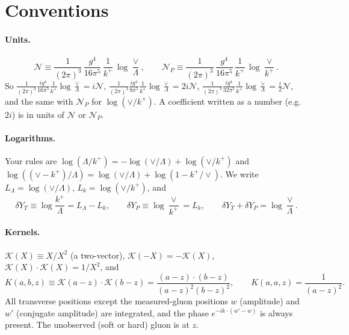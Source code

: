 \documentclass[10pt]{article}
\numberwithin{equation}{section}
\newcommand{\KK}{\mathcal K}
\newcommand{\NN}{\mathcal N}
\newcommand{\NP}{\mathcal N_{P}}
\begin{document}
\section{Conventions}\label{sec:conv}
\paragraph{Units.}
\begin{equation}
\NN\equiv\frac{1}{(2\pi)^3}\,\frac{g^4}{16\pi^5}\,\frac{1}{k^+}\,\log\frac{\vee}{\Lambda},\qquad
\NP\equiv\frac{1}{(2\pi)^3}\,\frac{g^4}{16\pi^5}\,\frac{1}{k^+}\,\log\frac{\vee}{k^+}.
\label{eq:NN}
\end{equation}
So $\frac{1}{(2\pi)^3}\frac{ig^4}{16\pi^5}\frac{1}{k^+}\log\frac\vee\Lambda=i\NN$, $\frac{1}{(2\pi)^3}\frac{ig^4}{8\pi^5}\frac{1}{k^+}\log\frac\vee\Lambda=2i\NN$, $\frac{1}{(2\pi)^3}\frac{ig^4}{32\pi^5}\frac{1}{k^+}\log\frac\vee\Lambda=\frac i2\NN$, and the same with $\NP$ for $\log(\vee/k^+)$. A coefficient written as a number (e.g.\ $2i$) is in units of $\NN$ or $\NP$.

\paragraph{Logarithms.} Your rules are $\log(\Lambda/k^+)=-\log(\vee/\Lambda)+\log(\vee/k^+)$ and $\log((\vee-k^+)/\Lambda)=\log(\vee/\Lambda)+\log(1-k^+/\vee)$. We write $L_\Lambda=\log(\vee/\Lambda)$, $L_k=\log(\vee/k^+)$, and
\begin{equation}
\delta Y_T\equiv\log\frac{k^+}{\Lambda}=L_\Lambda-L_k,\qquad \delta Y_P\equiv\log\frac{\vee}{k^+}=L_k,\qquad \delta Y_T+\delta Y_P=\log\frac{\vee}{\Lambda}.
\end{equation}

\paragraph{Kernels.} $\KK(X)\equiv X/X^2$ (a two-vector), $\KK(-X)=-\KK(X)$, $\KK(X)\cdot\KK(X)=1/X^2$, and
\begin{equation}
K(a,b,z)\equiv\KK(a-z)\cdot\KK(b-z)=\frac{(a-z)\cdot(b-z)}{(a-z)^2(b-z)^2},\qquad K(a,a,z)=\frac{1}{(a-z)^2}.
\end{equation}
All transverse positions except the measured-gluon positions $w$ (amplitude) and $w'$ (conjugate amplitude) are integrated, and the phase $e^{-ik\cdot(w'-w)}$ is always present. The unobserved (soft or hard) gluon is at $z$.
\end{document}
